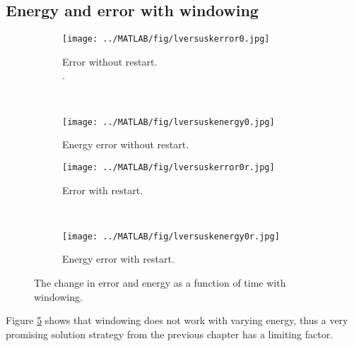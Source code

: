 \subsection{Energy and error with windowing}%
\begin{figure}[H]
        \centering
        \begin{subfigure}[b]{0.3\textwidth}
                \texttt{[image: ../MATLAB/fig/lversuskerror0.jpg]}
                \caption{ Error without restart.\\. }
                \label{fig:lversuskerror0}
        \end{subfigure}
		~
		\begin{subfigure}[b]{0.3\textwidth}
                \texttt{[image: ../MATLAB/fig/lversuskenergy0.jpg]}
                \caption{ Energy error without restart. }
                \label{fig:lversuskenergy0}
        \end{subfigure}
        
		\begin{subfigure}[b]{0.3\textwidth}
                \texttt{[image: ../MATLAB/fig/lversuskerror0r.jpg]}
                \caption{ Error with restart. }
                \label{fig:lversuskerror0r}
        \end{subfigure}
		~
		\begin{subfigure}[b]{0.3\textwidth}
                \texttt{[image: ../MATLAB/fig/lversuskenergy0r.jpg]}
                \caption{ Energy error with restart. }
                \label{fig:lversuskenergy0r}
        \end{subfigure}
                \caption{ The change in error and energy as a function of time with windowing.}
        \label{fig:lversuskenergy}
\end{figure}
\noindent Figure \ref{fig:lversuskenergy} shows that windowing does not work with varying energy, thus a very promising solution strategy from the previous chapter has a limiting factor.\\

